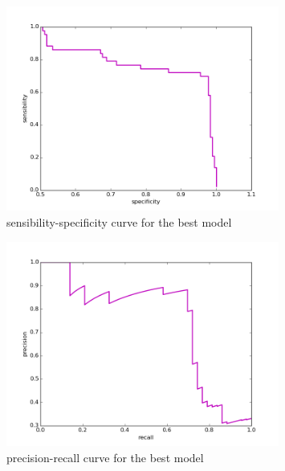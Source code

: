 \documentclass{article}
\begin{document}
\begin{figure}[h]
	\centering
	\includegraphics[width= 0.8\textwidth]{sensibility_specificity.png}
	\caption{sensibility-specificity curve for the best model}
	\label{fig:sensibility_specificity_best}
\end{figure}

\begin{figure}[h]
	\centering
	\includegraphics[width= 0.8\textwidth]{precision_recall.png}
	\caption{precision-recall curve for the best model}
	\label{fig:precision_recall_best}
\end{figure}
\end{document}
